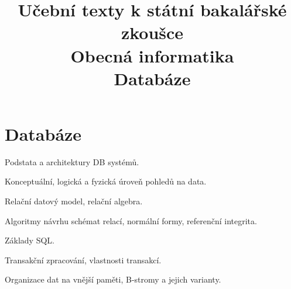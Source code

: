 \clearpage  \clearpage
\title{\LARGE Učební texty k státní bakalářské zkoušce \\ Obecná informatika \\ Databáze}

\maketitle
\newpage
\setcounter{section}{3}
\section{Databáze}
\begin{pozadavky}
\begin{pitemize}
\item Podstata a architektury DB systémů.
\item Konceptuální, logická a fyzická úroveň pohledů na data.
\item Relační datový model, relační algebra.
\item Algoritmy návrhu schémat relací, normální formy, referenční integrita.
\item Základy SQL.
\item Transakční zpracování, vlastnosti transakcí.
\item Organizace dat na vnější paměti, B-stromy a jejich varianty.
\end{pitemize}
\end{pozadavky}









